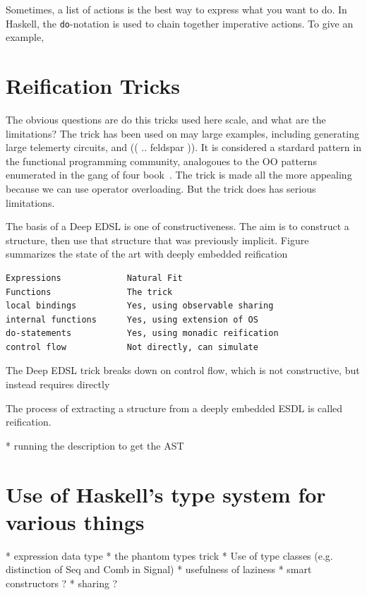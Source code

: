 \documentclass[11pt]{article}
\begin{document}
Sometimes, a list of actions is the best way to express what you want to do.
In Haskell, the \verb|do|-notation is used to chain together imperative actions.
To give an example, 

\section{Reification Tricks}

The obvious questions are do this tricks used here scale,
and what are the limitations? The trick has
been used on may large examples, including
generating large telemerty circuits, 
and (( .. feldspar )). It is considered a
stardard pattern in the functional programming
community, analogoues to the OO patterns
enumerated in the gang of four book~\cite{..}.
The trick is made all the more appealing
because we can use operator overloading.
But the trick does has serious limitations.

The basis of a Deep EDSL is one of constructiveness.
The aim is to construct a structure, then
use that structure that was previously implicit.
Figure summarizes the state of the art with
deeply embedded reification

\begin{verbatim}
Expressions             Natural Fit
Functions               The trick
local bindings          Yes, using observable sharing
internal functions      Yes, using extension of OS
do-statements           Yes, using monadic reification
control flow            Not directly, can simulate
\end{verbatim}

The Deep EDSL trick breaks down on control flow,
which is not constructive, but instead requires
directly 

The process of extracting a structure from a deeply embedded ESDL
is called reification. 

 * running the description to get the AST 

\section{Use of Haskell’s type system for various things }

 * expression data type 
 * the phantom types trick 
 * Use of type classes (e.g. distinction of Seq and Comb in Signal) 
 * usefulness of laziness 
 * smart constructors ? 
 * sharing ?

\end{document}
